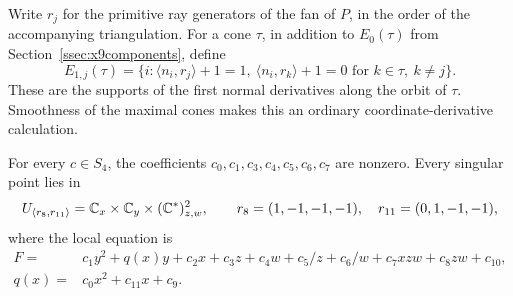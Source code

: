 Write $r_j$ for the primitive ray generators of the fan of $P$, in the
order of the accompanying triangulation. For a cone $\tau$, in addition
to $E_0(\tau)$ from Section~\ref{ssec:x9components}, define
\[
 E_{1,j}(\tau)=\{i:\langle n_i,r_j\rangle+1=1,
       \ \langle n_i,r_k\rangle+1=0\text{ for }k\in\tau,\ k\ne j\}.
\]
These are the supports of the first normal derivatives along the orbit
of $\tau$. Smoothness of the maximal cones makes this an ordinary
coordinate-derivative calculation.

\begin{lemma}\label{lem:x9boundaryglobal}
For every $c\in S_4$, the coefficients $c_0,c_1,c_3,c_4,c_5,c_6,c_7$
are nonzero. Every singular point lies in
\[
 U_{\langle r_8,r_{11}\rangle}
       =\mathbb C_x\times\mathbb C_y\times(\mathbb C^*)^2_{z,w},
 \qquad r_8=(1,-1,-1,-1),\quad r_{11}=(0,1,-1,-1),
\]
where the local equation is
\begin{equation}\label{eq:x9generalF}
\begin{split}
 F={}&c_1y^2+q(x)y+c_2x+c_3z+c_4w+c_5/z+c_6/w
                    +c_7xzw+c_8zw+c_{10},\\
 q(x)={}&c_0x^2+c_{11}x+c_9.
\end{split}
\end{equation}
\end{lemma}

